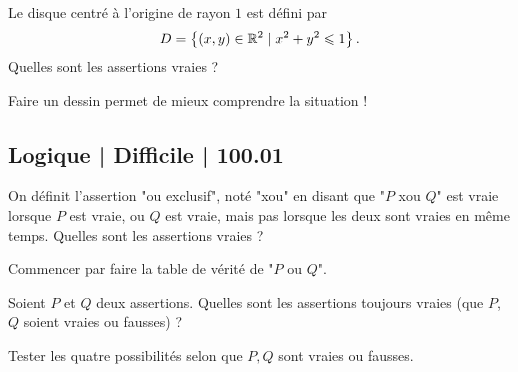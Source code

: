 \begin{question}
Le disque centré à l'origine de rayon $1$ est défini par 
$$D = \left\{ (x,y) \in \mathbb{R}^2 \mid x^2+y^2 \leqslant 1\right\}.$$
Quelles sont les assertions vraies ?
\begin{answers}
    


\end{answers}
\begin{explanations}
Faire un dessin permet de mieux comprendre la situation !
\end{explanations}
\end{question}



\subsection{Logique | Difficile | 100.01}


\begin{question}
On définit l'assertion "ou exclusif", noté "xou" en disant que "$P$ xou $Q$" est vraie lorsque $P$ est vraie, ou $Q$ est vraie, mais pas lorsque les deux sont vraies en même temps. Quelles sont les assertions vraies ?
\begin{answers}

    

\end{answers}
\begin{explanations}
Commencer par faire la table de vérité de "$P$ ou $Q$".
\end{explanations}
\end{question}


\begin{question}
Soient $P$ et $Q$ deux assertions. Quelles sont les assertions toujours vraies (que $P$, $Q$ soient vraies ou fausses)  ?
\begin{answers}



\end{answers}
\begin{explanations}
Tester les quatre possibilités selon que $P,Q$ sont vraies ou fausses.
\end{explanations}
\end{question}


